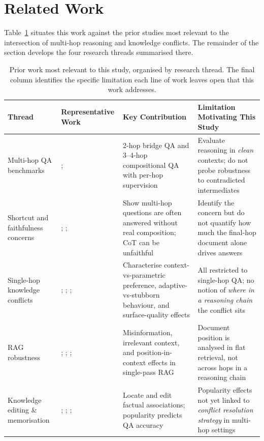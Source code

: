 \section{Related Work}
\label{sec:related_work}

Table~\ref{tab:related_work} situates this work against the prior studies most relevant to the intersection of multi-hop reasoning and knowledge conflicts. The remainder of the section develops the four research threads summarised there.

\begin{table}[!ht]
\centering
\caption{Prior work most relevant to this study, organised by research thread. The final column identifies the specific limitation each line of work leaves open that this work addresses.}
\label{tab:related_work}
\small
\begin{tabular}{p{}p{}p{}p{}}
\toprule
\textbf{Thread} & \textbf{Representative Work} & \textbf{Key Contribution} & \textbf{Limitation Motivating This Study} \\
\midrule
Multi-hop QA benchmarks & \citet{yang2018hotpotqa}; \citet{trivedi2022musique} & 2-hop bridge QA and 3--4-hop compositional QA with per-hop supervision & Evaluate reasoning in \emph{clean} contexts; do not probe robustness to contradicted intermediates \\
\addlinespace
Shortcut and faithfulness concerns & \citet{min2019compositional}; \citet{press2023measuring}; \citet{turpin2023language} & Show multi-hop questions are often answered without real composition; CoT can be unfaithful & Identify the concern but do not quantify how much the final-hop document alone drives answers \\
\addlinespace
Single-hop knowledge conflicts & \citet{longpre2021entity}; \citet{xie2024adaptive}; \citet{chen2022rich}; \citet{li2023large} & Characterise context-vs-parametric preference, adaptive-vs-stubborn behaviour, and surface-quality effects & All restricted to single-hop QA; no notion of \emph{where in a reasoning chain} the conflict sits \\
\addlinespace
RAG robustness & \citet{pan2023risk}; \citet{shi2023large}; \citet{liu2024lost}; \citet{yoran2024making} & Misinformation, irrelevant context, and position-in-context effects in single-pass RAG & Document position is analysed in flat retrieval, not across hops in a reasoning chain \\
\addlinespace
Knowledge editing \& memorisation & \citet{meng2022locating}; \citet{mitchell2022fast}; \citet{mallen2023when}; \citet{zhu2023physics} & Locate and edit factual associations; popularity predicts QA accuracy & Popularity effects not yet linked to \emph{conflict resolution strategy} in multi-hop settings \\
\bottomrule
\end{tabular}
\end{table}

